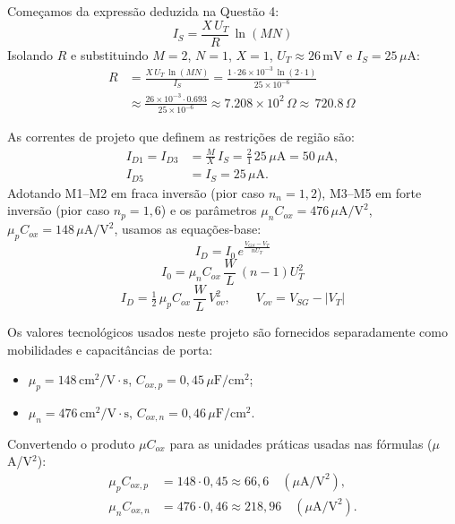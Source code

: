 ﻿\documentclass[12pt,a4paper]{article}
\begin{document}
Começamos da expressão deduzida na Questão 4:
\begin{equation}
    I_S = \frac{X\,U_T}{R}\,\ln(MN)
\end{equation}
Isolando $R$ e substituindo $M=2$, $N=1$, $X=1$, $U_T\approx 26\,\text{mV}$ e $I_S=25\,\mu\text{A}$:
\begin{align} %
    R 
    &= \frac{X\,U_T\,\ln(MN)}{I_S}
     = \frac{1\cdot 26\times 10^{-3}\,\ln(2\cdot 1)}{25\times 10^{-6}} \\[4pt]
    &\approx \frac{26\times 10^{-3}\cdot 0.693}{25\times 10^{-6}}
     \approx 7.208\times 10^{2} \, \Omega
     \approx \boxed{\,720.8\,\Omega\,}
\end{align}

As correntes de projeto que definem as restrições de região são:
\begin{align}
    I_{D1} = I_{D3} &= \frac{M}{X}\,I_S = \frac{2}{1}\,25\,\mu\text{A} = 50\,\mu\text{A}, \\
    I_{D5} &= I_S = 25\,\mu\text{A}.
\end{align}
Adotando M1–M2 em fraca inversão (pior caso $n_n=1{,}2$), M3–M5 em forte inversão (pior caso $n_p=1{,}6$) e os parâmetros $\mu_n C_{ox}=476\,\mu\text{A}/\text{V}^2$, $\mu_p C_{ox}=148\,\mu\text{A}/\text{V}^2$, usamos as equações-base:
\begin{equation}\label{eq:weak-id}
I_D = I_0\, e^{\tfrac{V_{GS}-V_T}{nU_T}}
\end{equation}
\begin{equation}\label{eq:I0}
I_0 = \mu_n C_{ox}\,\frac{W}{L}\,(n-1)U_T^2
\end{equation}
\begin{equation}\label{eq:strong-id}
I_D = \tfrac{1}{2}\,\mu_p C_{ox}\,\frac{W}{L}\,V_{ov}^2,\qquad V_{ov}=V_{SG}-|V_T|
\end{equation}

Os valores tecnológicos usados neste projeto são fornecidos separadamente como mobilidades e capacitâncias de porta:
\begin{center}
\begin{minipage}{0.55\textwidth}
\begin{itemize}
    \item $\mu_p = 148\,\text{cm}^2/\text{V}\cdot\text{s}$, \quad $C_{ox,p}=0{,}45\,\mu\text{F}/\text{cm}^2$;
    \item $\mu_n = 476\,\text{cm}^2/\text{V}\cdot\text{s}$, \quad $C_{ox,n}=0{,}46\,\mu\text{F}/\text{cm}^2$.
\end{itemize}
\end{minipage}
\end{center}
Convertendo o produto $\mu C_{ox}$ para as unidades práticas usadas nas fórmulas ($\mu$A/V$^2$):
\begin{align*}
\mu_p C_{ox,p} &= 148\cdot 0{,}45 \approx 66{,}6\quad (\mu\text{A}/\text{V}^2),\\
\mu_n C_{ox,n} &= 476\cdot 0{,}46 \approx 218{,}96\quad (\mu\text{A}/\text{V}^2).
\end{align*}
\end{document}
